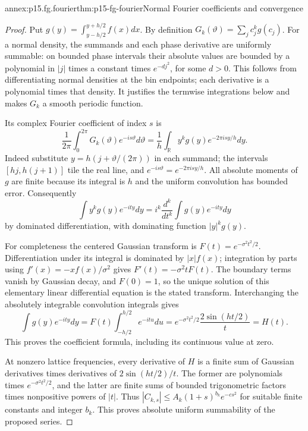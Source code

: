 \begin{annexitem}{annex:p15.fg.fourier}{thm:p15-fg-fourier}{Normal Fourier coefficients and convergence}
\begin{proof}
Put \(g(y)=\int_{y-h/2}^{y+h/2}f(x)dx\). By definition
\(G_k(\vartheta)=\sum_jc_j^kg(c_j)\). For a normal density,
the summands and each phase derivative are uniformly summable: on
bounded phase intervals their absolute values are bounded by a polynomial
in \(|j|\) times a constant times \(e^{-d j^2}\), for some \(d>0\).
This follows from differentiating normal densities at the bin endpoints;
each derivative is a polynomial times that density. It justifies the
termwise integrations below and makes \(G_k\) a smooth periodic function.

Its complex Fourier coefficient of index \(s\) is
\[
 \frac1{2\pi}\int_0^{2\pi}G_k(\vartheta)e^{-is\vartheta}d\vartheta
 =\frac1h\int_{\mathbb R}y^kg(y)e^{-2\pi isy/h}dy.
\]
Indeed substitute \(y=h(j+\vartheta/(2\pi))\) in each summand;
the intervals \([hj,h(j+1)]\) tile the real line, and
\(e^{-is\vartheta}=e^{-2\pi isy/h}\).
All absolute moments of \(g\) are finite because its integral is \(h\)
and the uniform convolution has bounded error. Consequently
\[
 \int y^kg(y)e^{-ity}dy=i^k\frac{d^k}{dt^k}
                       \int g(y)e^{-ity}dy
\]
by dominated differentiation, with dominating function \(|y|^kg(y)\).

For completeness the centered Gaussian transform is
\(F(t)=e^{-\sigma^2t^2/2}\). Differentiation under its integral is
dominated by \(|x|f(x)\); integration by parts using
\(f'(x)=-xf(x)/\sigma^2\) gives \(F'(t)=-\sigma^2tF(t)\).
The boundary terms vanish by Gaussian decay, and \(F(0)=1\), so the
unique solution of this elementary linear differential equation is the
stated transform. Interchanging the absolutely integrable convolution
integrals gives
\[
 \int g(y)e^{-ity}dy
 =F(t)\int_{-h/2}^{h/2}e^{-itu}du
 =e^{-\sigma^2t^2/2}\frac{2\sin(ht/2)}t=H(t).
\]
This proves the coefficient formula, including its continuous value at zero.

At nonzero lattice frequencies, every derivative of \(H\) is a finite
sum of Gaussian derivatives times derivatives of \(2\sin(ht/2)/t\).
The former are polynomials times \(e^{-\sigma^2t^2/2}\), and the latter
are finite sums of bounded trigonometric factors times nonpositive powers
of \(|t|\). Thus \(|C_{k,s}|\leq A_k(1+s)^{b_k}e^{-cs^2}\)
for suitable finite constants and integer \(b_k\). This proves absolute
uniform summability of the proposed series.


\end{proof}
\end{annexitem}
